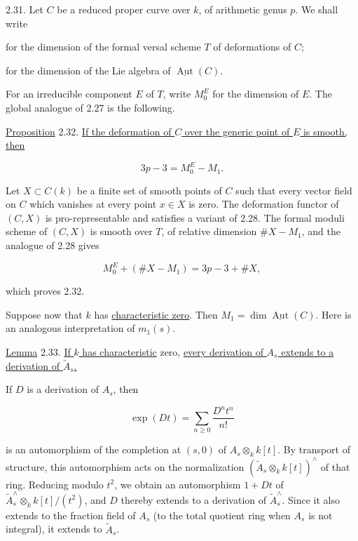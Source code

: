 
2.31. Let $C$ be a reduced proper curve over $k$, of arithmetic genus $p$.
We shall write

\begin{description}[leftmargin=2.7cm,style=nextline]
\item[$M_0$] for the dimension of the formal versal scheme $T$ of deformations
of $C$;
\item[$M_1$] for the dimension of the Lie algebra of
$\underline{\operatorname{Aut}}(C)$.
\end{description}

For an irreducible component $E$ of $T$, write $M_0^E$ for the dimension of
$E$.  The global analogue of 2.27 is the following.

\underline{Proposition} 2.32. \underline{If the deformation of $C$ over the
generic point of $E$ is smooth, then}

\begin{equation*}
3p-3=M_0^E-M_1.
\end{equation*}

Let $X\subset C(k)$ be a finite set of smooth points of $C$ such that every
vector field on $C$ which vanishes at every point $x\in X$ is zero.  The
deformation functor of $(C,X)$ is pro-representable and satisfies a variant of
2.28.  The formal moduli scheme of $(C,X)$ is smooth over $T$, of relative
dimension $\#X-M_1$, and the analogue of 2.28 gives

\begin{equation*}
M_0^E+(\#X-M_1)=3p-3+\#X,
\end{equation*}

which proves 2.32.

Suppose now that $k$ has \underline{characteristic zero}.  Then
$M_1=\dim\underline{\operatorname{Aut}}(C)$.  Here is an analogous
interpretation of $m_1(s)$.


\underline{Lemma} 2.33. \underline{If $k$ has characteristic} zero, \underline{every
derivation of $A_s$ extends to a derivation of $\widetilde A_s$.}

If $D$ is a derivation of $A_s$, then

\begin{equation*}
\exp(Dt)=\sum_{n\geq0}\frac{D^nt^n}{n!}
\end{equation*}

is an automorphism of the completion at $(s,0)$ of
$A_s\otimes_k k[t]$.  By transport of structure, this automorphism acts on the
normalization $(\widetilde A_s\otimes_k k[t])^{\wedge}$ of that ring.  Reducing
modulo $t^2$, we obtain an automorphism $1+Dt$ of
$\widetilde A_s^{\wedge}\otimes_k k[t]/(t^2)$, and $D$ thereby extends to a
derivation of $\widetilde A_s^{\wedge}$.  Since it also extends to the fraction
field of $A_s$ (to the total quotient ring when $A_s$ is not integral), it
extends to $\widetilde A_s$.

